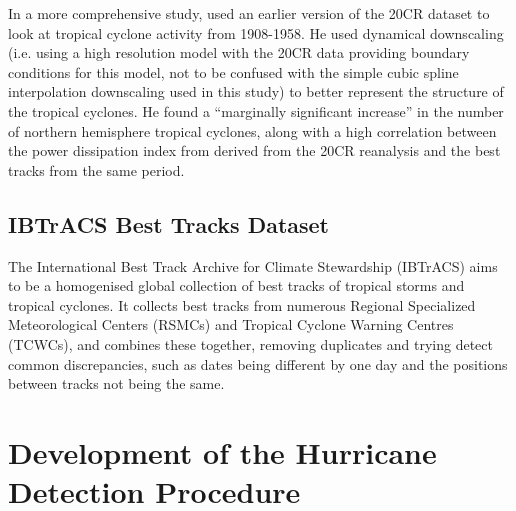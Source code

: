\documentclass[pdftex,12pt,a4paper]{report}
\begin{document}
In a more comprehensive study, \textcite{emanuel2010tropical} used an earlier version of the 20CR
dataset to look at tropical cyclone activity from 1908-1958. He used dynamical downscaling (i.e.
using a high resolution model with the 20CR data providing boundary conditions for this model, not
to be confused with the simple cubic spline interpolation downscaling used in this study) to better
represent the structure of the tropical cyclones. He found a ``marginally significant increase'' in
the number of northern hemisphere tropical cyclones, along with a high correlation between the power
dissipation index from derived from the 20CR reanalysis and the best tracks from the same period.


\section{IBTrACS Best Tracks Dataset}
\label{sec:ibtracs}
The International Best Track Archive for Climate Stewardship (IBTrACS)
\parencite{knappInternational2010} aims to be a homogenised global collection of best tracks of
tropical storms and tropical cyclones. It collects best tracks from numerous Regional Specialized
Meteorological Centers (RSMCs) and Tropical Cyclone Warning Centres (TCWCs), and combines these
together, removing duplicates and trying detect common discrepancies, such as dates being different
by one day and the positions between tracks not being the same. 


\chapter{Development of the Hurricane Detection Procedure}
\label{chap:development}

\end{document}
